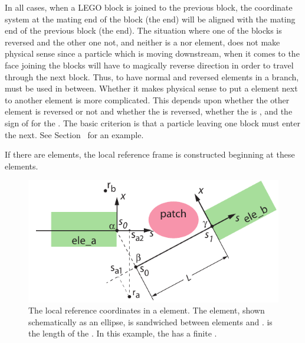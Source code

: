 In all cases, when a LEGO block is joined to the previous block, the
coordinate system at the mating end of the block (the 
end) will be aligned with the mating end of the previous block (the
 end). The situation where one of the blocks is
reversed and the other one not, and neither is a  nor
 element, does not make physical sense since a
particle which is moving downstream, when it comes to the face joining
the blocks will have to magically reverse direction in order to travel
through the next block. Thus, to have normal and reversed elements in
a branch,   must be used in between.
Whether it makes physical sense to put a  element next to
another element is more complicated. This depends upon whether the
other element is reversed or not and whether the  is
reversed, whether the  is , and the sign of
 for the . The basic criterion is that a
particle leaving one block must enter the next. See
Section~ for an example.

If there are  elements, the local reference frame is
constructed beginning at these elements.


\begin{figure}[tb]
  \centering
  \includegraphics[width=5in]{patch-problem.pdf}
  \caption[The local reference coordinates in a  element.]
{The local reference coordinates in a  element. The
 element, shown schematically as an ellipse, is sandwiched
between elements  and .  is the length of
the . In this example, the  has a finite
.}
  \label{f:patch.prob}
\end{figure}

